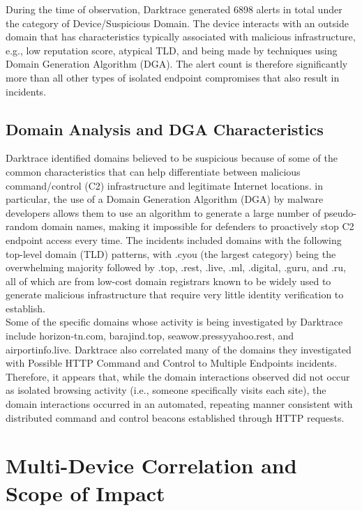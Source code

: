 \documentclass[12pt,a4paper]{report}
\begin{document}
During the time of observation, Darktrace generated 6898 alerts in total under the category of Device/Suspicious Domain. The device interacts with an outside domain that has characteristics typically associated with malicious infrastructure, e.g., low reputation score, atypical TLD, and being made by techniques using Domain Generation Algorithm (DGA). The alert count is therefore significantly more than all other types of isolated endpoint compromises that also result in incidents.


\subsection{ Domain Analysis and DGA Characteristics}
Darktrace identified domains believed to be suspicious because of some of the common characteristics that can help differentiate between malicious command/control (C2) infrastructure and legitimate Internet locations. in particular, the use of a Domain Generation Algorithm (DGA) by malware developers allows them to use an algorithm to generate a large number of pseudo-random domain names, making it impossible for defenders to proactively stop C2 endpoint access every time. The incidents included domains with the following top-level domain (TLD) patterns, with .cyou (the largest category) being the overwhelming majority followed by .top, .rest, .live, .ml, .digital, .guru, and .ru, all of which are from low-cost domain registrars known to be widely used to generate malicious infrastructure that require very little identity verification to establish.\\

Some of the specific domains whose activity is being investigated by Darktrace include horizon-tn.com, barajind.top, seawow.pressyyahoo.rest, and airportinfo.live. Darktrace also correlated many of the domains they investigated with Possible HTTP Command and Control to Multiple Endpoints incidents. Therefore, it appears that, while the domain interactions observed did not occur as isolated browsing activity (i.e., someone specifically visits each site), the domain interactions occurred in an automated, repeating manner consistent with distributed command and control beacons established through HTTP requests.


\section{Multi-Device Correlation and Scope of Impact}
\end{document}
